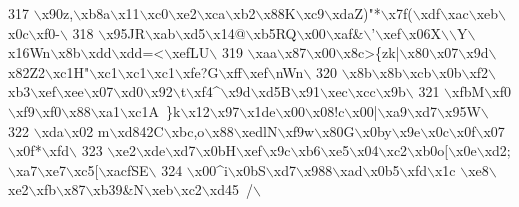 \begin{DoxyCode}
317 \textcolor{stringliteral}{\(\backslash\)x90z,\(\backslash\)xb8a\(\backslash\)x11\(\backslash\)xc0\(\backslash\)xe2\(\backslash\)xca\(\backslash\)xb2\(\backslash\)x88K\(\backslash\)xc9\(\backslash\)xdaZ)"*\(\backslash\)x7f(\(\backslash\)xdf\(\backslash\)xac\(\backslash\)xeb\(\backslash\)x0c\(\backslash\)xf0-\(\backslash\)}
318 \textcolor{stringliteral}{\(\backslash\)x95JR\(\backslash\)xab\(\backslash\)xd5\(\backslash\)x14@\(\backslash\)xb5RQ\(\backslash\)x00\(\backslash\)xaf&\(\backslash\)'\(\backslash\)xef\(\backslash\)x06X\(\backslash\)\(\backslash\)Y\(\backslash\)x16Wn\(\backslash\)x8b\(\backslash\)xdd\(\backslash\)xdd=<\(\backslash\)xefLU\(\backslash\)}
319 \textcolor{stringliteral}{\(\backslash\)xaa\(\backslash\)x87\(\backslash\)x00\(\backslash\)x8c>\{zk|\(\backslash\)x80\(\backslash\)x07\(\backslash\)x9d\(\backslash\)x82Z2\(\backslash\)xc1H"\(\backslash\)xc1\(\backslash\)xc1\(\backslash\)xc1\(\backslash\)xfe?G\(\backslash\)xff\(\backslash\)xef\(\backslash\)nWn\(\backslash\)}
320 \textcolor{stringliteral}{\(\backslash\)x8b\(\backslash\)x8b\(\backslash\)xcb\(\backslash\)x0b\(\backslash\)xf2\(\backslash\)xb3\(\backslash\)xef\(\backslash\)xee\(\backslash\)x07\(\backslash\)xd0\(\backslash\)x92\(\backslash\)t\(\backslash\)xf4^\(\backslash\)x9d\(\backslash\)xd5B\(\backslash\)x91\(\backslash\)xec\(\backslash\)xcc\(\backslash\)x9b\(\backslash\)}
321 \textcolor{stringliteral}{\(\backslash\)xfbM\(\backslash\)xf0\(\backslash\)xf9\(\backslash\)xf0\(\backslash\)x88\(\backslash\)xa1\(\backslash\)xc1A~\}k\(\backslash\)x12\(\backslash\)x97\(\backslash\)x1de\(\backslash\)x00\(\backslash\)x08!c\(\backslash\)x00|\(\backslash\)xa9\(\backslash\)xd7\(\backslash\)x95W\(\backslash\)}
322 \textcolor{stringliteral}{\(\backslash\)xda\(\backslash\)x02 m\(\backslash\)xd842C\(\backslash\)xbc,o\(\backslash\)x88\(\backslash\)xedlN\(\backslash\)xf9w\(\backslash\)x80G\(\backslash\)x0by\(\backslash\)x9e\(\backslash\)x0c\(\backslash\)x0f\(\backslash\)x07\(\backslash\)x0f*\(\backslash\)xfd\(\backslash\)}
323 \textcolor{stringliteral}{\(\backslash\)xe2\(\backslash\)xde\(\backslash\)xd7\(\backslash\)x0bH\(\backslash\)xef\(\backslash\)x9c\(\backslash\)xb6\(\backslash\)xe5\(\backslash\)x04\(\backslash\)xc2\(\backslash\)xb0o[\(\backslash\)x0e\(\backslash\)xd2;\(\backslash\)xa7\(\backslash\)xe7\(\backslash\)xc5[\(\backslash\)xacfSE\(\backslash\)}
324 \textcolor{stringliteral}{\(\backslash\)x00^i\(\backslash\)x0bS\(\backslash\)xd7\(\backslash\)x988\(\backslash\)xad\(\backslash\)x0b5\(\backslash\)xfd\(\backslash\)x1c \(\backslash\)xe8\(\backslash\)xe2\(\backslash\)xfb\(\backslash\)x87\(\backslash\)xb39&N\(\backslash\)xeb\(\backslash\)xc2\(\backslash\)xd45~/\(\backslash\)}

\end{DoxyCode}
